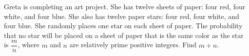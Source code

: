 Greta is completing an art project. She has twelve sheets of paper: four red, four white, and four blue. She also has twelve paper stars: four red, four white, and four blue. She randomly places one star on each sheet of paper. The probability that no star will be placed on a sheet of paper that is the same color as the star is $\dfrac{m}{n}$, where $m$ and $n$ are relatively prime positive integers. Find $m + n$.
